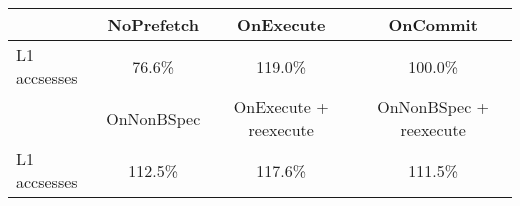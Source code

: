 \begin{tabular}{ l|ccc }
 & NoPrefetch & OnExecute & OnCommit\\ \hline
L1 accsesses & 76.6\% & 119.0\% & 100.0\%\\ \hline
\hline
 & OnNonBSpec & OnExecute + reexecute & OnNonBSpec + reexecute\\ \hline
L1 accsesses & 112.5\% & 117.6\% & 111.5\%\\ \hline
\end{tabular}


